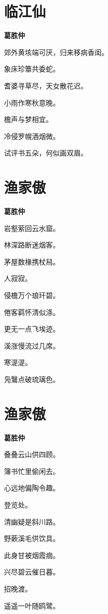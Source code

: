 \documentclass[12pt,a4paper]{ctexbook}
\begin{document}
\section{临江仙}
\textbf{葛胜仲}\par\vspace{0.5em}
郊外黄垓端可厌，归来移病香闺。\par
象床珍簟共委蛇。\par
耆婆寻草尽，天女散花迟。\par
小雨作寒秋意晚。\par
檐声与梦相宜。\par
冷侵罗幌酒烟微。\par
试评书五朵，何似画双眉。\par

\section{渔家傲}
\textbf{葛胜仲}\par\vspace{0.5em}
岩壑萦回云水窟。\par
林深路断迷烟客。\par
茅屋数椽携杖舄。\par
人寂寂。\par
侵檐万个琅玕碧。\par
倦客羁怀清似涤。\par
更无一点飞埃迹。\par
溪涨慢流过几席。\par
寒湜湜。\par
凫鷖点破琉璃色。\par

\section{渔家傲}
\textbf{葛胜仲}\par\vspace{0.5em}
叠叠云山供四顾。\par
簿书忙里偷闲去。\par
心远地偏陶令趣。\par
登览处。\par
清幽疑是斜川路。\par
野蔌溪毛供饮具。\par
此身甘被烟霞痼。\par
兴尽碧云催日暮。\par
招晚渡。\par
遥遥一叶随鸥鹭。\par
\end{document}
